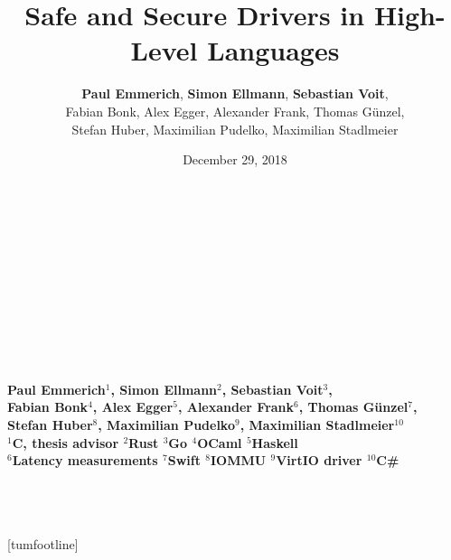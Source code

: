 \documentclass[NET,english,aspectratio=169,notitleframe]{tumbeamer}
\author[Paul Emmerich, Simon Ellmann, Sebastian Voit]{\textbf{Paul Emmerich}, \textbf{Simon Ellmann}, \textbf{Sebastian Voit},\\ Fabian Bonk, Alex Egger, Alexander Frank, Thomas Günzel,\\ Stefan Huber,  Maximilian Pudelko, Maximilian Stadlmeier}
\title{Safe and Secure Drivers in High-Level Languages}
\date{December 29, 2018}
\begin{document}
  \begin{frame}[c,noframenumbering]
  \centering%
  \Large%
  \strut\textcolor{TUMBlue}{\inserttitle}%
  \\[4ex]%
  \normalsize%
  \strut\insertauthor%
  \\[2ex]%
  \footnotesize%
  \insertdate%
  \\[4ex]%
  \ifdefined\departmentname%
    \ifdefined\chairname%
      \chairname\\%
    \fi%
    \departmentname\\%
  \fi%
  \TUMname\\%
\end{frame}

  \begin{frame}[c,noframenumbering]
  \centering%
  \Large%
  \strut\textcolor{TUMBlue}{\inserttitle}%
  \\[4ex]%
  \normalsize%
  \strut{}\bfseries Paul Emmerich$^1$, Simon Ellmann$^2$, Sebastian Voit$^3$,\\ Fabian Bonk$^4$, Alex Egger$^5$, Alexander Frank$^6$, Thomas Günzel$^7$,\\ Stefan Huber$^8$, Maximilian Pudelko$^9$, Maximilian Stadlmeier$^{10}$ \normalfont %
  \\[2ex]%
  \footnotesize%
  $^1$C, thesis advisor\hspace{1em}
  $^2$Rust\hspace{1em}
  $^3$Go\hspace{1em}
  $^4$OCaml\hspace{1em}
  $^5$Haskell\hspace{1em}\\
  $^6$Latency measurements\hspace{1em}
  $^7$Swift\hspace{1em}
  $^8$IOMMU\hspace{1em}
  $^9$VirtIO driver\hspace{1em}
  $^{10}$C\#\hspace{1em}
  \\[4ex]%
    \ifdefined\departmentname%
    \ifdefined\chairname%
      \chairname\\%
    \fi%
    \departmentname\\%
  \fi%
  \TUMname\\%
\end{frame}
[tumfootline]
\end{document}
